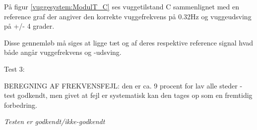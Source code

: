 På figur \ref{vuggesystem:ModulT_C} ses vuggetilstand C sammenlignet med en reference graf der angiver den korrekte vuggefrekvens på 0.32Hz og vuggeudsving på +/- 4 grader.


Disse gennemløb må siges at ligge tæt og af deres respektive reference signal hvad både angår vuggefrekvens og -udsving.

Test 3: \\

BEREGNING AF FREKVENSFEJL: den er ca. 9 procent for lav alle steder - test godkendt, men givet at fejl er systematisk kan den tages op som en fremtidig forbedring.



\textit{Testen er godkendt/ikke-godkendt}